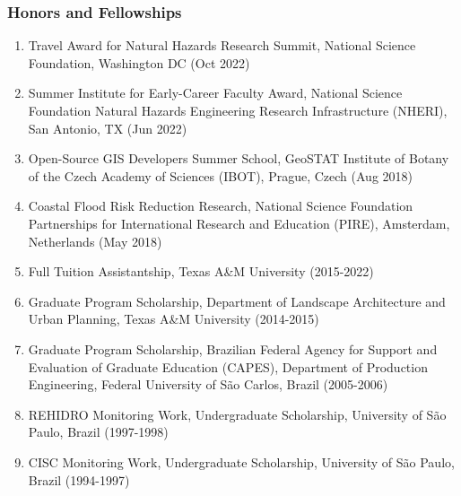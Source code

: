 \documentclass[11pt,oneside]{article}
\begin{document}
\subsubsection{Honors and Fellowships}
\begin{enumerate}[leftmargin=40pt]
\item {Travel Award for Natural Hazards Research Summit}, National Science Foundation, Washington DC (Oct 2022)
\item {Summer Institute for Early-Career Faculty Award}, National Science Foundation Natural Hazards Engineering Research Infrastructure (NHERI), San Antonio, TX (Jun 2022)
\item {Open-Source GIS Developers Summer School}, GeoSTAT Institute of Botany of the Czech Academy of Sciences (IBOT), Prague, Czech (Aug 2018)
\item {Coastal Flood Risk Reduction Research}, National Science Foundation Partnerships for International Research and Education (PIRE), Amsterdam, Netherlands (May 2018)
\item {Full Tuition Assistantship}, Texas A\&M University (2015-2022)
\item {Graduate Program Scholarship}, Department of Landscape Architecture and Urban Planning, Texas A\&M University (2014-2015)
\item {Graduate Program Scholarship}, Brazilian Federal Agency for Support and Evaluation of Graduate Education (CAPES), Department of Production Engineering, Federal University of São Carlos, Brazil (2005-2006)
\item {REHIDRO Monitoring Work, Undergraduate Scholarship}, University of São Paulo, Brazil (1997-1998)
\item {CISC Monitoring Work, Undergraduate Scholarship}, University of São Paulo, Brazil (1994-1997)
\end{enumerate}
\end{document}
